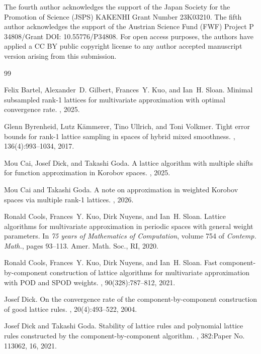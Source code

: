 \documentclass[a4paper,11pt]{article}
\begin{document}
The fourth author acknowledges the support of the Japan Society for the Promotion of Science (JSPS) KAKENHI Grant Number 23K03210. The fifth author acknowledges the support of the Austrian Science Fund (FWF) Project  P 34808/Grant DOI: 10.55776/P34808. For open access purposes, the authors have applied a CC BY public copyright license to any author accepted manuscript version arising from this submission.

\begin{thebibliography}{99}

Felix Bartel, Alexander~D. Gilbert, Frances~Y. Kuo, and Ian~H. Sloan.
\newblock Minimal subsampled rank-1 lattices for multivariate approximation
  with optimal convergence rate.
, 2025.

Glenn Byrenheid, Lutz K\"{a}mmerer, Tino Ullrich, and Toni Volkmer.
\newblock Tight error bounds for rank-1 lattice sampling in spaces of hybrid
  mixed smoothness.
, 136(4):993--1034, 2017.

Mou Cai, Josef Dick, and Takashi Goda.
\newblock A lattice algorithm with multiple shifts for function approximation
  in {K}orobov spaces.
, 2025.

Mou Cai and Takashi Goda.
\newblock A note on approximation in weighted {K}orobov spaces via multiple
  rank-1 lattices.
, 2026.

Ronald Cools, Frances~Y. Kuo, Dirk Nuyens, and Ian~H. Sloan.
\newblock Lattice algorithms for multivariate approximation in periodic spaces
  with general weight parameters.
\newblock In {\em 75 years of {M}athematics of {C}omputation}, volume 754 of
  {\em Contemp. Math.}, pages 93--113. Amer. Math. Soc., RI, 2020.

Ronald Cools, Frances~Y. Kuo, Dirk Nuyens, and Ian~H. Sloan.
\newblock Fast component-by-component construction of lattice algorithms for
  multivariate approximation with {POD} and {SPOD} weights.
, 90(328):787--812, 2021.

Josef Dick.
\newblock On the convergence rate of the component-by-component construction of
  good lattice rules.
, 20(4):493--522, 2004.

Josef Dick and Takashi Goda.
\newblock Stability of lattice rules and polynomial lattice rules constructed
  by the component-by-component algorithm.
, 382:Paper No. 113062, 16, 2021.


\end{thebibliography}
\end{document}

